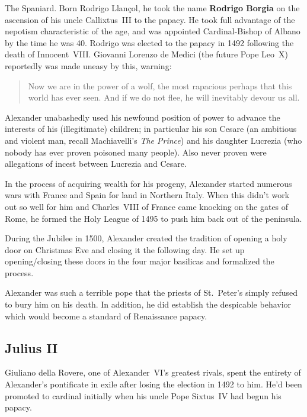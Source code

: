 The Spaniard.
Born Rodrigo Llan\c{c}ol,
he took the name \textbf{Rodrigo Borgia} on the ascension of his uncle Callixtus~III to the papacy.
He took full advantage of the nepotism characteristic of the age,
and was appointed Cardinal-Bishop of Albano by the time he was 40.
Rodrigo was elected to the papacy in 1492 following the death of Innocent~VIII\@.
Giovanni Lorenzo de Medici (the future Pope Leo~X) reportedly was made uneasy by this, warning:

\begin{quote}
  Now we are in the power of a wolf, the most rapacious perhaps that this world has ever seen.
  And if we do not flee, he will inevitably devour us all.
\end{quote}

Alexander unabashedly used his newfound position of power to advance the interests of his (illegitimate) children;
in particular his son Cesare (an ambitious and violent man, recall Machiavelli's \textit{The Prince})
and his daughter Lucrezia (who nobody has ever proven poisoned many people).
Also never proven were allegations of incest between Lucrezia and Cesare.

In the process of acquiring wealth for his progeny,
Alexander started numerous wars with France and Spain for land in Northern Italy.
When this didn't work out so well for him and Charles~VIII of France came knocking on the gates of Rome,
he formed the Holy League of 1495 to push him back out of the peninsula.

During the Jubilee in 1500,
Alexander created the tradition of opening a holy door on Christmas Eve and closing it the following day.
He set up opening/closing these doors in the four major basilicas and formalized the process.

Alexander was such a terrible pope that the priests of St.\ Peter's simply refused to bury him on his death.
In addition, he did establish the despicable behavior which would become a standard of Renaissance papacy.

\subsection*{Julius II}

Giuliano della Rovere, one of Alexander~VI's greatest rivals,
spent the entirety of Alexander's pontificate in exile after losing the election in 1492 to him.
He'd been promoted to cardinal initially when his uncle Pope Sixtus~IV had begun his papacy.


